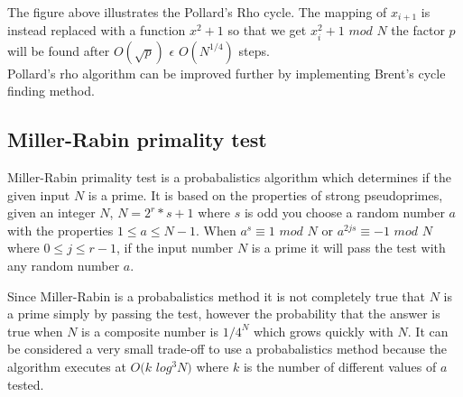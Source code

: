 The figure above illustrates the Pollard's Rho cycle. The mapping of $x_{i+1}$ is instead replaced with a function $x^2+1$ so that we get $x^2_{i}+1$  $mod$ $N$ the factor $p$ will be found after $O(\sqrt{p})$  $\epsilon$ $O(N^{1/4})$ steps. \cite{avalg}\\

Pollard's rho algorithm can be improved further by implementing Brent's cycle finding method. \cite{brent}

\subsection{Miller-Rabin primality test}
Miller-Rabin primality test is a probabalistics algorithm which determines if the given input $N$ is a prime. It is based on the properties of strong pseudoprimes, given an integer $N$, $N = 2^r * s + 1$ where $s$ is odd you choose a random number $a$ with the properties $1 \leq a \leq N - 1$. When $a^s \equiv 1$ $mod$ $N$ or $a^{2js} \equiv - 1$ $mod$ $N$ where $0 \leq j \leq r - 1$, if the input number $N$ is a prime it will pass the test with any random number $a$.

Since Miller-Rabin is a probabalistics method it is not completely true that $N$ is a prime simply by passing the test, however the probability that the answer is true when $N$ is a composite number is $1 / 4^{N}$ which grows quickly with $N$. It can be considered a very small trade-off to use a probabalistics method because the algorithm executes at $O(k$ $log^3 N)$ where $k$ is the number of different values of $a$ tested. \cite{miller}